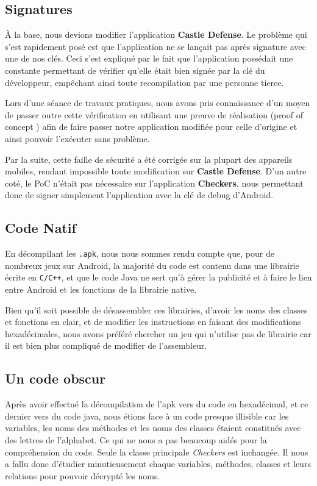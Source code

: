 \subsection{Signatures}

À la base, nous devions modifier l'application \textbf{Castle Defense}.
Le problème qui s'est rapidement posé est que l'application ne se lançait pas après signature avec une de nos clés.
Ceci s'est expliqué par le fait que l'application possédait une constante permettant de vérifier qu'elle était bien signée par la clé du développeur,
empêchant ainsi toute recompilation par une personne tierce.

Lors d'une séance de travaux pratiques, nous avons pris connaissance d'un moyen de passer outre cette vérification en utilisant une preuve de réalisation
(proof of concept \cite{PoC}) afin de faire passer notre application modifiée pour celle d'origine et ainsi pouvoir l'exécuter sans problème.

Par la suite, cette faille de sécurité a été corrigée sur la plupart des appareils mobiles,
rendant impossible toute modification sur \textbf{Castle Defense}.
D'un autre coté, le PoC n'était pas nécessaire sur l'application \textbf{Checkers},
nous permettant donc de signer simplement l'application avec la clé de debug d'Android.


\subsection{Code Natif}

En décompilant les \texttt{.apk}, nous nous sommes rendu compte que, pour de nombreux jeux sur Android, la majorité du code est contenu dans une librairie écrite en \texttt{C/C++}, et que le code Java ne sert qu'à gérer la publicité et à faire le lien entre Android et les fonctions de la librairie native.

Bien qu'il soit possible de désassembler ces librairies, d'avoir les noms des classes et fonctions en clair, et de modifier les instructions en faisant des modifications hexadécimales, nous avons préféré chercher un jeu qui n'utilise pas de librairie car il est bien plus compliqué de modifier de l'assembleur.

\subsection{Un code obscur}
Après avoir effectué la décompilation de l'apk vers du code en hexadécimal, et ce dernier vers du code java, nous étions face à un code presque illisible car les variables, les noms des méthodes et les noms des classes étaient constitués avec des lettres de l'alphabet. Ce qui ne nous a pas beaucoup aidés pour la compréhension du code.
Seule la classe principale \textit{Checkers} est inchangée. Il nous a fallu donc d'étudier minutieusement chaque variables, méthodes, classes et leurs relations pour pouvoir décrypté les noms.
